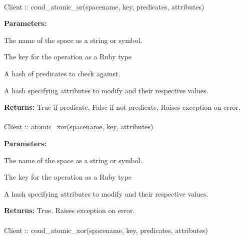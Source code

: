\paragraph{}
\begin{ccode}
Client :: cond_atomic_or(spacename, key, predicates, attributes)
\end{ccode}
\funcdesc 

\noindent\textbf{Parameters:}
\begin{description}[labelindent=\widthof{{\code{predicates}}},leftmargin=*,noitemsep,nolistsep,align=right]
\item[\code{spacename}] The name of the space as a string or symbol.
\item[\code{key}] The key for the operation as a Ruby type
\item[\code{predicates}] A hash of predicates to check against.
\item[\code{attributes}] A hash specifying attributes to modify and their respective values.
\end{description}

\noindent\textbf{Returns:}
True if predicate, False if not predicate.  Raises exception on error.

\paragraph{}
\begin{ccode}
Client :: atomic_xor(spacename, key, attributes)
\end{ccode}
\funcdesc 

\noindent\textbf{Parameters:}
\begin{description}[labelindent=\widthof{{\code{attributes}}},leftmargin=*,noitemsep,nolistsep,align=right]
\item[\code{spacename}] The name of the space as a string or symbol.
\item[\code{key}] The key for the operation as a Ruby type
\item[\code{attributes}] A hash specifying attributes to modify and their respective values.
\end{description}

\noindent\textbf{Returns:}
True.  Raises exception on error.

\paragraph{}
\begin{ccode}
Client :: cond_atomic_xor(spacename, key, predicates, attributes)
\end{ccode}
\funcdesc 

